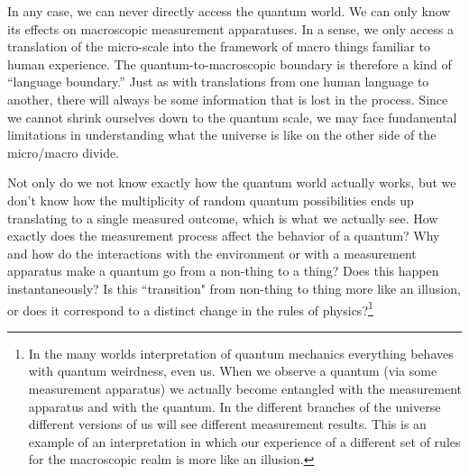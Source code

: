\documentclass[12pt,onecolumn,preprintnumbers,amsmath,amssymbn,reprint,nofootinbib,superscriptaddress]{revtex4}    %
\begin{document}
In any case, we can never directly access the quantum world. We can only know its effects on macroscopic measurement apparatuses. In a sense, we only access a translation of the micro-scale into the framework of macro things familiar to human experience. The quantum-to-macroscopic boundary is therefore a kind of ``language boundary.'' Just as with translations from one human language to another, there will always be some information that is lost in the process.  Since we cannot shrink ourselves down to the quantum scale, we may face fundamental limitations in understanding what the universe is like on the other side of the micro/macro divide.


Not only do we not know exactly how the quantum world actually works, but we don't know how the multiplicity of random quantum possibilities ends up translating to a single measured outcome, which is what we actually see.   How exactly does the measurement process affect the behavior of a quantum?  Why and how do the interactions with the environment or with a measurement apparatus make a quantum go from a non-thing to a thing? Does this happen instantaneously? Is this ``transition" from non-thing to thing more like an illusion, or does it correspond to a distinct change in the rules of physics?\footnote{In the many worlds interpretation of quantum mechanics everything behaves with quantum weirdness, even us. When we observe a quantum (via some measurement apparatus) we actually become entangled with the measurement apparatus and with the quantum. In the different branches of the universe different versions of us will see different measurement results. This is an example of an interpretation in which our experience of a different set of rules for the macroscopic realm is more like an illusion. } 
\end{document}
